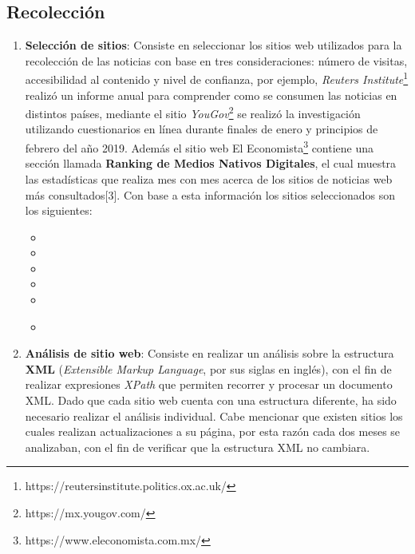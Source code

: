 \subsection{Recolección}

\begin{enumerate}
  \item \textbf{Selección de sitios}: Consiste en seleccionar los sitios web utilizados para la recolección de las noticias con base en tres consideraciones: número de visitas, accesibilidad al contenido y nivel de confianza, por ejemplo, \textit{Reuters Institute}\footnote{https://reutersinstitute.politics.ox.ac.uk/} realizó un informe anual para comprender como se consumen las noticias en distintos países, mediante el sitio \textit{YouGov}\footnote{https://mx.yougov.com/} se realizó la investigación utilizando cuestionarios en línea durante finales de enero y principios de febrero del año 2019. Además el sitio web El Economista\footnote{https://www.eleconomista.com.mx/} contiene una sección llamada \textbf{Ranking de Medios Nativos Digitales}, el cual muestra las estadísticas que realiza mes con mes acerca de los sitios de noticias web más consultados[3]. Con base a esta información los sitios seleccionados son los siguientes:\\

  \begin{itemize}
    \item {}
    \item {}
    \item {}
    \item {}
    \item {}
    \item {}\\
  \end{itemize}

  \item \textbf{Análisis de sitio web}: Consiste en realizar un análisis sobre la estructura \textbf{XML} (\textit{Extensible Markup Language}, por sus siglas en inglés), con el fin de realizar expresiones \textit{XPath} que permiten recorrer y procesar un documento XML. Dado que cada sitio web cuenta con una estructura diferente, ha sido necesario realizar el análisis individual. Cabe mencionar que existen sitios los cuales realizan actualizaciones a su página, por esta razón cada dos meses se analizaban, con el fin de verificar que la estructura XML no cambiara.\\


\end{enumerate}

